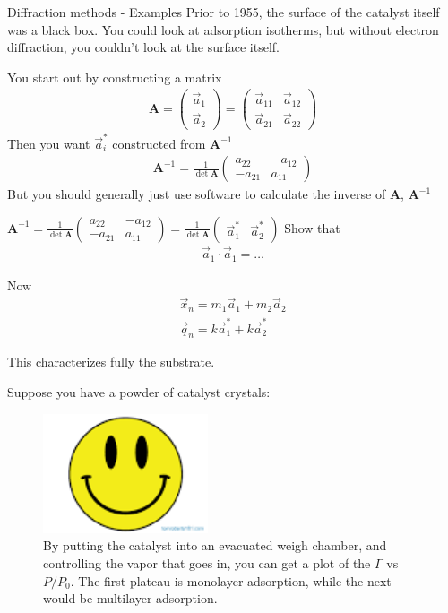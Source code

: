 \documentclass{article}
\newcommand{\matr}[1]{\bm{#1}}
\newcommand{\aistar}[0]{\vec{a}_i^\ast}
\newcommand{\aone}[0]{\vec{a}_1}
\newcommand{\atwo}[0]{\vec{a}_2}
\newcommand{\pmat}[1]{\begin{pmatrix}#1\end{pmatrix}}
\newcommand{\qvec}[0]{\vec{q}}
\newcommand{\xvec}[0]{\vec{x}}
\begin{document}
\begin{section}{Diffraction methods - Examples}
Prior to 1955, the surface of the catalyst itself was a black box. You could look at adsorption isotherms, but without electron diffraction, you couldn't look at the surface itself.

You start out by constructing a matrix
\begin{align*}
	\matr{A} = \pmat{\aone\\\atwo} = \pmat{\vec{a}_{11} & \vec{a}_{12}\\\vec{a}_{21} & \vec{a}_{22}}
\end{align*}
Then you want $\aistar$ constructed from $\matr{A}^{-1}$
\begin{align*}
	\matr{A}^{-1} = \frac{1}{\det{\matr{A}}}\pmat{a_{22} & -a_{12}\\-a_{21} & a_{11}}
\end{align*}
But you should generally just use software to calculate the inverse of $\matr{A}$, $\matr{A}^{-1}$

$\matr{A}^{-1} = \frac{1}{\det{\matr{A}}}\pmat{a_{22} & -a_{12}\\-a_{21} & a_{11}} = \frac{1}{\det\matr{A}}\pmat{\vec{a}_1^\ast & \vec{a}_2^\ast}$
Show that 
\begin{align*}
	\aone \cdot \aone = \dots
\end{align*}

Now 
\begin{align*}
	\xvec_n = m_1\aone + m_2\atwo\\
	\qvec_n = k\aone^\ast + k\atwo^\ast
\end{align*}

This characterizes fully the substrate.

Suppose you have a powder of catalyst crystals:

\begin{figure}[h]
	\centering
	\includegraphics[height=100pt]{vacuumChamber}
	\caption{By putting the catalyst into an evacuated weigh chamber, and controlling the vapor that goes in, you can get a plot of the $\Gamma$ vs $P/P_0$. The first plateau is monolayer adsorption, while the next would be multilayer adsorption.}
	\label{fig:catalystCrystals}
\end{figure}


\end{section}
\end{document}
